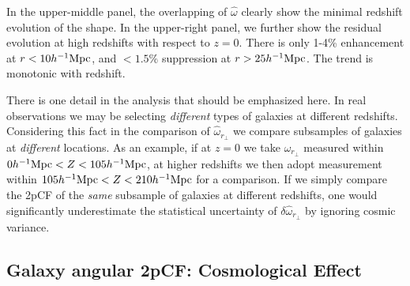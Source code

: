 \documentclass[iop]{emulateapj}
\begin{document}
In the upper-middle panel, the overlapping of $\hat\omega$
clearly show the minimal redshift evolution of the shape.
In the upper-right panel, 
we further show the residual evolution at high redshifts 
with respect to $z=0$.
There is only 1-4\% enhancement 
at $r<10h^{-1}\rm Mpc$,
and $<1.5\%$ suppression at $r>25 h^{-1}\rm Mpc$.
The trend is monotonic with redshift.

There is one detail in the analysis that should be emphasized here.
In real observations we may be selecting {\it different} types of galaxies at different redshifts.
Considering this fact in the comparison of $\hat\omega_{r_\perp}$ 
we compare subsamples of galaxies at {\it different} locations.
As an example, if at $z=0$ we take $\hat\omega_{r_\perp}$ measured within $0h^{-1}{\rm Mpc}<Z<105 h^{-1}{\rm Mpc}$,
at higher redshifts we then adopt measurement within $105h^{-1}{\rm Mpc}<Z<210 h^{-1}{\rm Mpc}$ for a comparison.
If we simply compare the 2pCF of the {\it same} subsample of galaxies at different redshifts, 
one would significantly underestimate the statistical uncertainty of $\delta \hat{\omega}_{r_\perp}$ by ignoring cosmic variance.




\subsection{Galaxy angular 2pCF: Cosmological Effect }
\end{document}
